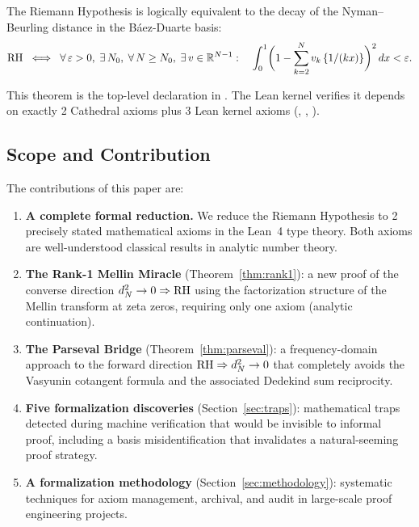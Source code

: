 \documentclass[11pt,a4paper]{article}
\begin{document}
\begin{theorem}
\label{thm:crown}
The Riemann Hypothesis is logically equivalent to the decay of the
Nyman--Beurling distance in the B\'aez-Duarte basis:
\[
  \mathrm{RH} \;\iff\;
  \forall\,\varepsilon > 0,\;\exists\,N_0,\;\forall\,N \geq N_0,\;
  \exists\,v \in \mathbb{R}^{N-1} :\quad
  \int_0^1 \biggl(1 - \sum_{k=2}^{N} v_k\,\{1/(kx)\}\biggr)^2\,dx < \varepsilon.
\]
\end{theorem}

This theorem is the top-level declaration 
in . The Lean kernel verifies it depends on
exactly 2 Cathedral axioms plus 3 Lean kernel axioms (,
, ).

\subsection{Scope and Contribution}

The contributions of this paper are:

\begin{enumerate}
  \item \textbf{A complete formal reduction.} We reduce the Riemann
    Hypothesis to 2 precisely stated mathematical axioms in the Lean~4
    type theory. Both axioms are well-understood classical results in
    analytic number theory.

  \item \textbf{The Rank-1 Mellin Miracle} (Theorem~\ref{thm:rank1}):
    a new proof of the converse direction $d_N^2 \to 0 \Rightarrow \mathrm{RH}$
    using the factorization structure of the Mellin transform at zeta zeros,
    requiring only one axiom (analytic continuation).

  \item \textbf{The Parseval Bridge} (Theorem~\ref{thm:parseval}):
    a frequency-domain approach to the forward direction
    $\mathrm{RH} \Rightarrow d_N^2 \to 0$ that completely avoids the Vasyunin
    cotangent formula and the associated Dedekind sum reciprocity.

  \item \textbf{Five formalization discoveries} (Section~\ref{sec:traps}):
    mathematical traps detected during machine verification that would be
    invisible to informal proof, including a basis misidentification
    that invalidates a natural-seeming proof strategy.

  \item \textbf{A formalization methodology} (Section~\ref{sec:methodology}):
    systematic techniques for axiom management, archival, and audit
    in large-scale proof engineering projects.
\end{enumerate}
\end{document}
